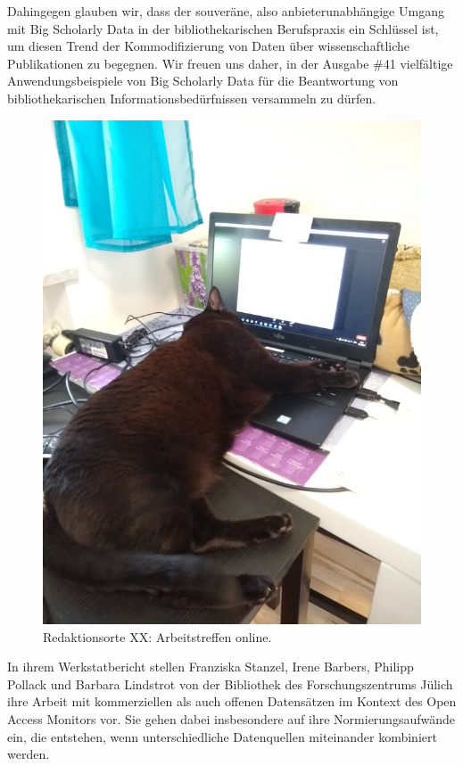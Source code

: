 \documentclass[a4paper,
fontsize=11pt,
oneside,
numbers=noperiodatend,
parskip=half-,
bibliography=totoc,
final
]{scrartcl}
\begin{document}
Dahingegen glauben wir, dass der souveräne, also anbieterunabhängige
Umgang mit Big Scholarly Data in der bibliothekarischen Berufspraxis ein
Schlüssel ist, um diesen Trend der Kommodifizierung von Daten über
wissenschaftliche Publikationen zu begegnen. Wir freuen uns daher, in
der Ausgabe \#41 vielfältige Anwendungsbeispiele von Big Scholarly Data
für die Beantwortung von bibliothekarischen Informationsbedürfnissen
versammeln zu dürfen.

\begin{figure}
\centering
\includegraphics{image.png}
\caption{Redaktionsorte XX: Arbeitstreffen online.}
\end{figure}

In ihrem Werkstatbericht stellen Franziska Stanzel, Irene Barbers,
Philipp Pollack und Barbara Lindstrot von der Bibliothek des
Forschungszentrums Jülich ihre Arbeit mit kommerziellen als auch offenen
Datensätzen im Kontext des Open Access Monitors vor. Sie gehen dabei
insbesondere auf ihre Normierungsaufwände ein, die entstehen, wenn
unterschiedliche Datenquellen miteinander kombiniert werden.
\end{document}
